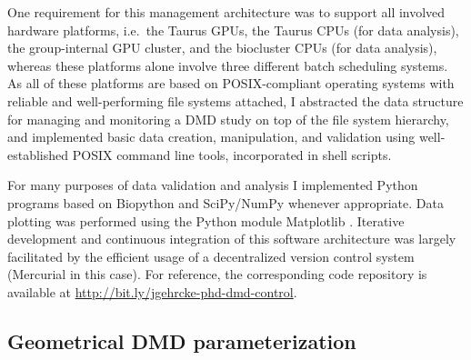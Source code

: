 One requirement for this management architecture was to support all involved
hardware platforms, i.e.\ the Taurus GPUs, the Taurus CPUs (for data analysis),
the group-internal GPU cluster, and the biocluster CPUs (for data analysis),
whereas these platforms alone involve three different batch scheduling systems.
As all of these platforms are based on POSIX-compliant operating systems with
reliable and well-performing file systems attached, I abstracted the data
structure for managing and monitoring a DMD study on top of the file system
hierarchy, and implemented basic data creation, manipulation, and validation
using well-established POSIX command line tools, incorporated in shell scripts.

For many purposes of data validation and analysis I implemented Python
programs based on Biopython \cite{biopython_web} and SciPy/NumPy
\cite{scipy_numpy} whenever appropriate. Data plotting was performed using
the Python module Matplotlib \cite{matplotlib_web}. Iterative development and
continuous integration of this software architecture was largely facilitated by
the efficient usage of a decentralized version control system (Mercurial
\cite{mercurial_web} in this case). For reference, the corresponding code
repository is available at \url{http://bit.ly/jgehrcke-phd-dmd-control}.


\subsection{Geometrical DMD parameterization}
\label{dmdil10:method_geom_setup}


